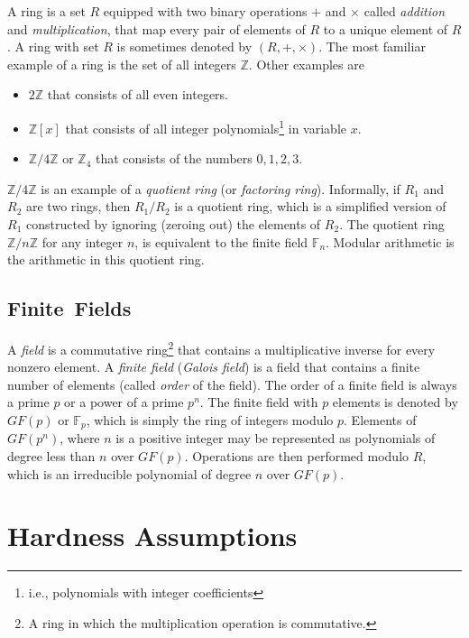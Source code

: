 \documentclass[11pt]{article}
\theoremstyle{plain}
\begin{document}
A ring is a set $R$ equipped with two binary operations $+$ and
$\times$ called \emph{addition} and \emph{multiplication}, that map
every pair of elements of $R$ to a unique element of $R$. A ring
with set $R$ is sometimes denoted by $(R,+,\times)$. The most familiar
example of a ring is the set of all integers $\mathbb{Z}$. Other
examples are 
\begin{itemize}
	\item $2\mathbb{Z}$ that consists of all even integers. 
	\item $\mathbb{Z}[x]$ that consists of all integer polynomials\footnote{i.e., polynomials with integer coefficients}
	in variable $x$. 
	\item $\mathbb{Z}/4\mathbb{Z}$ or $\mathbb{Z}_{4}$ that consists of the
	numbers $0,1,2,3$. 
\end{itemize}
$\mathbb{Z}/4\mathbb{Z}$ is an example of a \emph{quotient ring}
(or \emph{factoring ring}). Informally, if $R_{1}$ and $R_{2}$ are
two rings, then $R_{1}/R_{2}$ is a quotient ring, which is a simplified
version of $R_{1}$ constructed by ignoring (zeroing out) the elements
of $R_{2}$. The quotient ring $\mathbb{Z}/n\mathbb{Z}$ for any integer
$n$, is equivalent to the finite field $\mathbb{F}_{n}$. Modular
arithmetic is the arithmetic in this quotient ring.

\subsection{Finite~Fields}

A \emph{field} is a commutative ring\footnote{A ring in which the multiplication operation is commutative.}
that contains a multiplicative inverse for every nonzero element.
A \emph{finite field} (\emph{Galois field}) is a field that contains
a finite number of elements (called \emph{order} of the field). The
order of a finite field is always a prime $p$ or a power of a prime
$p^{n}$. The finite field with $p$ elements is denoted by $GF(p)$
or $\mathbb{F}_{p}$, which is simply the ring of integers modulo
$p$. Elements of $GF(p^{n})$, where $n$ is a positive integer may
be represented as polynomials of degree less than $n$ over $GF(p)$.
Operations are then performed modulo $R$, which is an irreducible
polynomial of degree $n$ over $GF(p)$.

\section{Hardness Assumptions}
\end{document}
